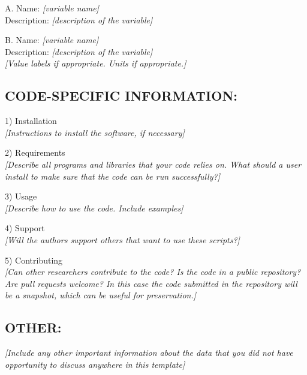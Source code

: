 \documentclass[]{article}
\begin{document}
A. Name: \emph{{[}variable name{]}}\\
Description: \emph{{[}description of the variable{]}}

B. Name: \emph{{[}variable name{]}}\\
Description: \emph{{[}description of the variable{]}}\\
\emph{{[}Value labels if appropriate. Units if appropriate.{]}}

\subsection{CODE-SPECIFIC INFORMATION:}\label{code-specific-information}

1) Installation\\
\emph{{[}Instructions to install the software, if necessary{]}}

2) Requirements\\
\emph{{[}Describe all programs and libraries that your code relies on.
What should a user install to make sure that the code can be run
successfully?{]}}

3) Usage\\
\emph{{[}Describe how to use the code. Include examples{]}}

4) Support\\
\emph{{[}Will the authors support others that want to use these
scripts?{]}}

5) Contributing\\
\emph{{[}Can other researchers contribute to the code? Is the code in a
public repository? Are pull requests welcome? In this case the code
submitted in the repository will be a snapshot, which can be useful for
preservation.{]}}

\subsection{OTHER:}\label{other}

\emph{{[}Include any other important information about the data that you
did not have opportunity to discuss anywhere in this template{]}}
\end{document}
